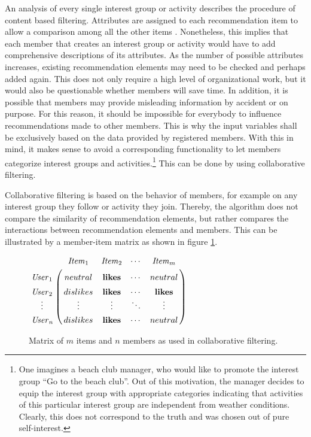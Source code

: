 \documentclass[12pt,numbers=noenddot,parskip,bibliography=totocnumbered,listof=totocnumbered]{scrreprt}
\begin{document}
An analysis of every single interest group or activity describes the procedure of content based filtering. Attributes are assigned to each recommendation item to allow a comparison among all the other items \citep[p.42]{klahold2009}. Nonetheless, this implies that each member that creates an interest group or activity would have to add comprehensive descriptions of its attributes. As the number of possible attributes increases, existing recommendation elements may need to be checked and perhaps added again. This does not only require a high level of organizational work, but it would also be questionable whether members will save time. In addition, it is possible that members may provide misleading information by accident or on purpose. For this reason, it should be impossible for everybody to influence recommendations made to other members. This is why the input variables shall be exclusively based on the data provided by registered members. With this in mind, it makes sense to avoid a corresponding functionality to let members categorize interest groups and activities.\footnote{One imagines a beach club manager, who would like to promote the interest group ``Go to the beach club''. Out of this motivation, the manager decides to equip the interest group with appropriate categories indicating that activities of this particular interest group are independent from weather conditions. Clearly, this does not correspond to the truth and was chosen out of pure self-interest.} This can be done by using collaborative filtering. 

Collaborative filtering is based on the behavior of members, for example on any interest group they follow or activity they join. \citep[p.62]{klahold2009} Thereby, the algorithm does not compare the similarity of recommendation elements, but rather compares the interactions between recommendation elements and members. This can be illustrated by a member-item matrix as shown in figure \ref{matrix}.

\begin{figure}
\centering
$\bordermatrix{~ & \mathit{Item}_1& \mathit{Item}_2 & \cdots & \mathit{Item}_m \cr
\vphantom{\vdots}\mathit{User}_1 & neutral & \mathbf{likes} & \cdots & neutral \cr
\vphantom{\vdots}\mathit{User}_2 & dislikes & \mathbf{likes} & \cdots & \mathbf{likes} \cr
\vdotswithin{\mathit{User}_1} & \vdotswithin{dislikes}  & \vdotswithin{likes} & \ddots & \vdotswithin{neutral} \cr
\vphantom{\vdots}\mathit{User}_n & dislikes & \mathbf{likes} & \cdots & neutral }$
\caption[Member-item matrix of collaborative filtering]{Matrix of $m$ items and $n$ members as used in collaborative filtering.}
\label{matrix}
\end{figure}
\end{document}
